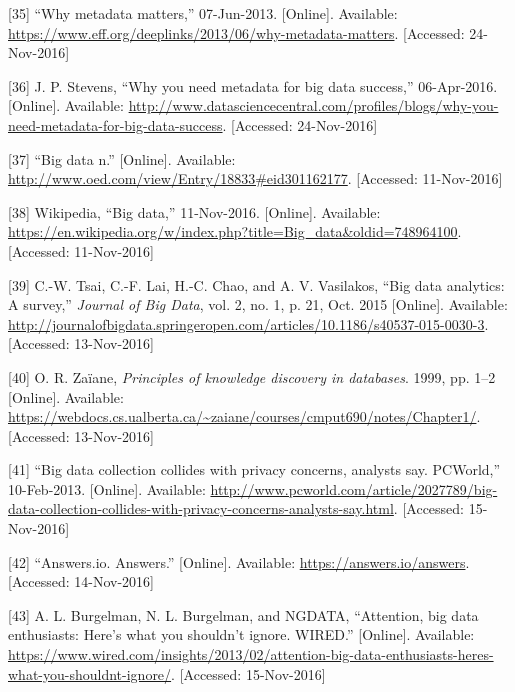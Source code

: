 \documentclass[12pt,english,a4paper,titlepage,cleardoublepage=empty,dottedtoc]{report}
\begin{document}
\hypertarget{ref-web_2013_why-metadata-matters}{}
{[}35{]} ``Why metadata matters,'' 07-Jun-2013. {[}Online{]}. Available:
\url{https://www.eff.org/deeplinks/2013/06/why-metadata-matters}.
{[}Accessed: 24-Nov-2016{]}

\hypertarget{ref-web_2016_why-you-need-metadata-for-big-data-to-success}{}
{[}36{]} J. P. Stevens, ``Why you need metadata for big data success,''
06-Apr-2016. {[}Online{]}. Available:
\url{http://www.datasciencecentral.com/profiles/blogs/why-you-need-metadata-for-big-data-success}.
{[}Accessed: 24-Nov-2016{]}

\hypertarget{ref-web_2016_oxford_definition_big-data}{}
{[}37{]} ``Big data n.'' {[}Online{]}. Available:
\url{http://www.oed.com/view/Entry/18833\#eid301162177}. {[}Accessed:
11-Nov-2016{]}

\hypertarget{ref-web_2016_wikipedia_definition_big-data}{}
{[}38{]} Wikipedia, ``Big data,'' 11-Nov-2016. {[}Online{]}. Available:
\url{https://en.wikipedia.org/w/index.php?title=Big_data\&oldid=748964100}.
{[}Accessed: 11-Nov-2016{]}

\hypertarget{ref-paper_2015_big-data-analytics_a-survey}{}
{[}39{]} C.-W. Tsai, C.-F. Lai, H.-C. Chao, and A. V. Vasilakos, ``Big
data analytics: A survey,'' \emph{Journal of Big Data}, vol. 2, no. 1,
p. 21, Oct. 2015 {[}Online{]}. Available:
\url{http://journalofbigdata.springeropen.com/articles/10.1186/s40537-015-0030-3}.
{[}Accessed: 13-Nov-2016{]}

\hypertarget{ref-book-chapter_1999_Principles-of-knowledge-discovery-in-databases_introduction-to-data-mining}{}
{[}40{]} O. R. Zaïane, \emph{Principles of knowledge discovery in
databases}. 1999, pp. 1--2 {[}Online{]}. Available:
\url{https://webdocs.cs.ualberta.ca/~zaiane/courses/cmput690/notes/Chapter1/}.
{[}Accessed: 13-Nov-2016{]}

\hypertarget{ref-web_2013_big-data-collection-collides-with-privacy-concerns}{}
{[}41{]} ``Big data collection collides with privacy concerns, analysts
say. PCWorld,'' 10-Feb-2013. {[}Online{]}. Available:
\url{http://www.pcworld.com/article/2027789/big-data-collection-collides-with-privacy-concerns-analysts-say.html}.
{[}Accessed: 15-Nov-2016{]}

\hypertarget{ref-web_2016_answers-io}{}
{[}42{]} ``Answers.io. Answers.'' {[}Online{]}. Available:
\url{https://answers.io/answers}. {[}Accessed: 14-Nov-2016{]}

\hypertarget{ref-web_2016_big-data-enthusiasts-should-not-ignore}{}
{[}43{]} A. L. Burgelman, N. L. Burgelman, and NGDATA, ``Attention, big
data enthusiasts: Here's what you shouldn't ignore. WIRED.''
{[}Online{]}. Available:
\url{https://www.wired.com/insights/2013/02/attention-big-data-enthusiasts-heres-what-you-shouldnt-ignore/}.
{[}Accessed: 15-Nov-2016{]}
\end{document}
